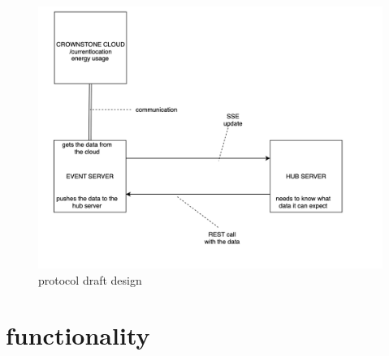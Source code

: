 \documentclass{article}
\begin{document}
\label{fig:protocolDraft}	
	\begin{figure}[H]
	\includegraphics[width=5in]{pictures/protocolDraft.png}
	\caption[Optional caption]{protocol draft design}
	\end{figure}
	

\section{functionality}



\end{document}
